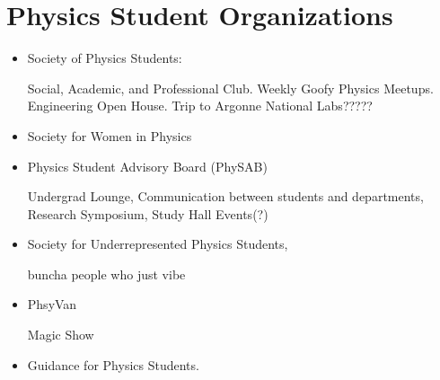 \documentclass{report}
\begin{document}
\newpage 
\section*{Physics Student Organizations}
\begin{itemize}
\item
Society of Physics Students:

Social, Academic, and Professional Club. Weekly Goofy Physics Meetups. Engineering Open House. Trip to Argonne National Labs????? 

\item
Society for Women in Physics

\item 
Physics Student Advisory Board (PhySAB)

Undergrad Lounge, Communication between students and departments, Research Symposium, Study Hall Events(?)

\item
 Society for Underrepresented Physics Students, 
 
 buncha people who just vibe
 
 \item
 PhsyVan
 
 Magic Show

\item 
Guidance for Physics Students. 

\end{itemize}
\end{document}
